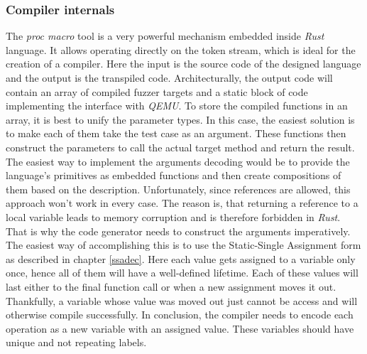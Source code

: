 \subsubsection{Compiler internals}
The \textit{proc macro} tool is a very powerful mechanism embedded inside \textit{Rust} language. It allows operating directly on the token stream, which is ideal for the creation of a compiler. Here the input is the source code of the designed language and the output is the transpiled code. Architecturally, the output code will contain an array of compiled fuzzer targets and a static block of code implementing the interface with \textit{QEMU}. To store the compiled functions in an array, it is best to unify the parameter types. In this case, the easiest solution is to make each of them take the test case as an argument. These functions then construct the parameters to call the actual target method and return the result. The easiest way to implement the arguments decoding would be to provide the language's primitives as embedded functions and then create compositions of them based on the description. Unfortunately, since references are allowed, this approach won't work in every case. The reason is, that returning a reference to a local variable leads to memory corruption and is therefore forbidden in \textit{Rust}. That is why the code generator needs to construct the arguments imperatively. The easiest way of accomplishing this is to use the Static-Single Assignment form as described in chapter \ref{ssadec}. Here each value gets assigned to a variable only once, hence all of them will have a well-defined lifetime. Each of these values will last either to the final function call or when a new assignment moves it out. Thankfully, a variable whose value was moved out just cannot be access and will otherwise compile successfully. In conclusion, the compiler needs to encode each operation as a new variable with an assigned value. These variables should have unique and not repeating labels.

